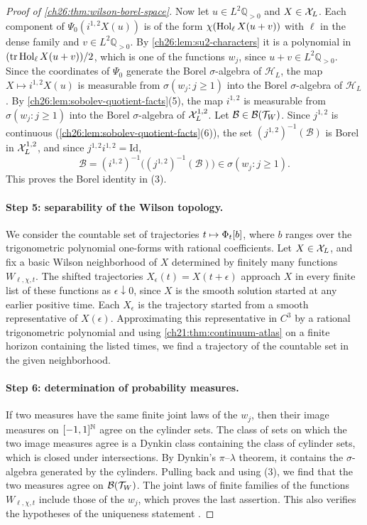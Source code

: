 \begin{proof}[Proof of \cref{ch26:thm:wilson-borel-space}]
Now let $u\in L^2\mathbb Q_{>0}$ and $X\in\mathcal X_L$. Each component of $\Psi_0(i^{1,2}X(u))$ is of the form $\chi(\operatorname{Hol}_\ell X(u+v))$ with $\ell$ in the dense family and $v\in L^2\mathbb Q_{>0}$. By \cref{ch26:lem:su2-characters} it is a polynomial in $(\operatorname{tr}\operatorname{Hol}_\ell X(u+v))/2$, which is one of the functions $w_j$, since $u+v\in L^2\mathbb Q_{>0}$. Since the coordinates of $\Psi_0$ generate the Borel $\sigma$-algebra of $\mathcal H_L$, the map $X\mapsto i^{1,2}X(u)$ is measurable from $\sigma(w_j:j\ge1)$ into the Borel $\sigma$-algebra of $\mathcal H_L$. By \cref{ch26:lem:sobolev-quotient-facts}(5), the map $i^{1,2}$ is measurable from $\sigma(w_j:j\ge1)$ into the Borel $\sigma$-algebra of $\mathcal X_L^{1,2}$. Let $\mathcal B\in\mathcal B(\mathcal T_W)$. Since $j^{1,2}$ is continuous (\cref{ch26:lem:sobolev-quotient-facts}(6)), the set $(j^{1,2})^{-1}(\mathcal B)$ is Borel in $\mathcal X_L^{1,2}$, and since $j^{1,2}i^{1,2}=\mathrm{Id}$,
\[
 \mathcal B=(i^{1,2})^{-1}\bigl((j^{1,2})^{-1}(\mathcal B)\bigr)\in\sigma(w_j:j\ge1).
\]
This proves the Borel identity in (3).

\paragraph{Step 5: separability of the Wilson topology.}
We consider the countable set of trajectories $t\mapsto\Phi_t[b]$, where $b$ ranges over the trigonometric polynomial one-forms with rational coefficients. Let $X\in\mathcal X_L$, and fix a basic Wilson neighborhood of $X$ determined by finitely many functions $W_{\ell,\chi,t}$. The shifted trajectories $X_\epsilon(t)=X(t+\epsilon)$ approach $X$ in every finite list of these functions as $\epsilon\downarrow0$, since $X$ is the smooth solution started at any earlier positive time. Each $X_\epsilon$ is the trajectory started from a smooth representative of $X(\epsilon)$. Approximating this representative in $C^3$ by a rational trigonometric polynomial and using \cref{ch21:thm:continuum-atlas} on a finite horizon containing the listed times, we find a trajectory of the countable set in the given neighborhood.

\paragraph{Step 6: determination of probability measures.}
If two measures have the same finite joint laws of the $w_j$, then their image measures on $[-1,1]^{\mathbb N}$ agree on the cylinder sets. The class of sets on which the two image measures agree is a Dynkin class containing the class of cylinder sets, which is closed under intersections. By Dynkin's $\pi$--$\lambda$ theorem, it contains the $\sigma$-algebra generated by the cylinders. Pulling back and using (3), we find that the two measures agree on $\mathcal B(\mathcal T_W)$. The joint laws of finite families of the functions $W_{\ell,\chi,t}$ include those of the $w_j$, which proves the last assertion. This also verifies the hypotheses of the uniqueness statement \cite[Lemma 1.4, p.~7]{CCState2023v4}.
\end{proof}

